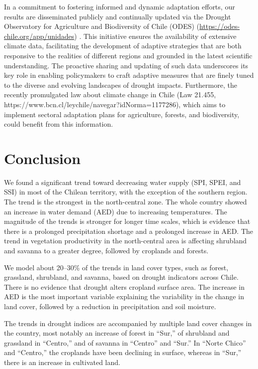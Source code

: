 \documentclass[
  authoryear,
  preprint,
  3p,
  onecolumn]{elsarticle}
\begin{document}
In a commitment to fostering informed and dynamic adaptation efforts,
our results are disseminated publicly and continually updated via the
Drought Observatory for Agriculture and Biodiversity of Chile (ODES)
(\url{https://odes-chile.org/app/unidades})
\citep{Zambrano2023b, Kunst2023}. This initiative ensures the
availability of extensive climate data, facilitating the development of
adaptive strategies that are both responsive to the realities of
different regions and grounded in the latest scientific understanding.
The proactive sharing and updating of such data underscores its key role
in enabling policymakers to craft adaptive measures that are finely
tuned to the diverse and evolving landscapes of drought impacts.
Furthermore, the recently promulgated law about climate change in Chile
(Law 21.455, https://www.bcn.cl/leychile/navegar?idNorma=1177286), which
aims to implement sectoral adaptation plans for agriculture, forests,
and biodiversity, could benefit from this information.

\hypertarget{conclusion}{%
\section{Conclusion}\label{conclusion}}

We found a significant trend toward decreasing water supply (SPI, SPEI,
and SSI) in most of the Chilean territory, with the exception of the
southern region. The trend is the strongest in the north-central zone.
The whole country showed an increase in water demand (AED) due to
increasing temperatures. The magnitude of the trends is stronger for
longer time scales, which is evidence that there is a prolonged
precipitation shortage and a prolonged increase in AED. The trend in
vegetation productivity in the north-central area is affecting shrubland
and savanna to a greater degree, followed by croplands and forests.

We model about 20--30\% of the trends in land cover types, such as
forest, grassland, shrubland, and savanna, based on drought indicators
across Chile. There is no evidence that drought alters cropland surface
area. The increase in AED is the most important variable explaining the
variability in the change in land cover, followed by a reduction in
precipitation and soil moisture.

The trends in drought indices are accompanied by multiple land cover
changes in the country, most notably an increase of forest in ``Sur,''
of shrubland and grassland in ``Centro,'' and of savanna in ``Centro''
and ``Sur.'' In ``Norte Chico'' and ``Centro,'' the croplands have been
declining in surface, whereas in ``Sur,'' there is an increase in
cultivated land.
\end{document}
